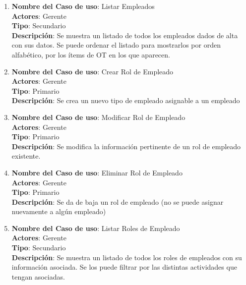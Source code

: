 \documentclass[12pt]{extarticle}
\begin{document}
\begin{spacing}{1.2}
\begin{enumerate}
            \item 	\textbf{Nombre del Caso de uso}: Listar Empleados\\
                    \textbf{Actores}: Gerente\\
                    \textbf{Tipo}: Secundario\\
                    \textbf{Descripción}: Se muestra un listado de todos los empleados dados de alta con sus datos. Se puede ordenar el listado para mostrarlos por orden alfabético, por los ítems de OT en los que aparecen.
            
            \item 	\textbf{Nombre del Caso de uso}: Crear Rol de Empleado\\
                    \textbf{Actores}: Gerente\\
                    \textbf{Tipo}: Primario\\
                    \textbf{Descripción}: Se crea un nuevo tipo de empleado asignable a un empleado
            
            \item 	\textbf{Nombre del Caso de uso}: Modificar Rol de Empleado\\
                    \textbf{Actores}: Gerente\\
                    \textbf{Tipo}: Primario\\
                    \textbf{Descripción}: Se modifica la información pertinente de un rol de empleado existente.
            
            \item 	\textbf{Nombre del Caso de uso}: Eliminar Rol de Empleado\\
                    \textbf{Actores}: Gerente\\
                    \textbf{Tipo}: Primario\\
                    \textbf{Descripción}: Se da de baja un rol de empleado (no se puede asignar nuevamente a algún empleado)
            
            \item 	\textbf{Nombre del Caso de uso}: Listar Roles de Empleado\\
                    \textbf{Actores}: Gerente\\
                    \textbf{Tipo}: Secundario\\
                    \textbf{Descripción}: Se muestra un listado de todos los roles de empleados con su información asociada. Se los puede filtrar por las distintas actividades que tengan asociadas.
            

\end{enumerate}
\end{spacing}
\end{document}
